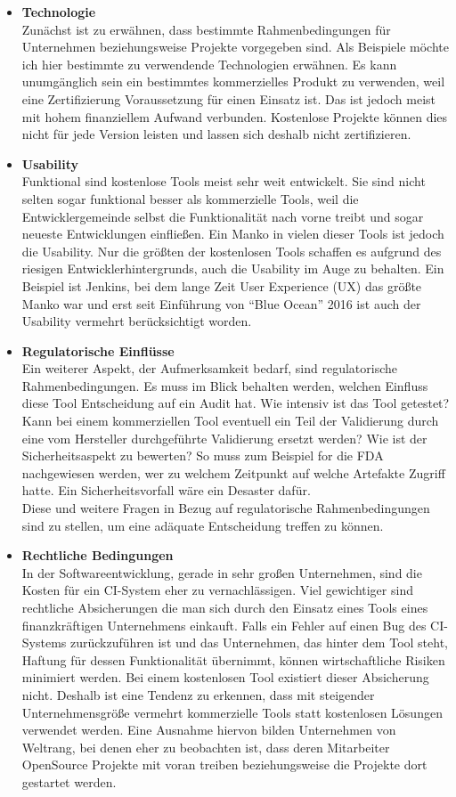 \begin{itemize}
	\item \textbf{Technologie}\\
	Zunächst ist zu erwähnen, dass bestimmte Rahmenbedingungen für Unternehmen beziehungsweise Projekte vorgegeben sind. Als Beispiele möchte ich hier bestimmte zu verwendende Technologien erwähnen. Es kann unumgänglich sein ein bestimmtes kommerzielles Produkt zu verwenden, weil eine Zertifizierung Voraussetzung für einen Einsatz ist. Das ist jedoch meist mit hohem finanziellem Aufwand verbunden. Kostenlose Projekte können dies nicht für jede Version leisten und lassen sich deshalb nicht zertifizieren.
	\item \textbf{Usability}\\
	Funktional sind kostenlose Tools meist sehr weit entwickelt. Sie sind nicht selten sogar funktional besser als kommerzielle Tools, weil die Entwicklergemeinde selbst die Funktionalität nach vorne treibt und sogar neueste Entwicklungen einfließen. Ein Manko in vielen dieser Tools ist jedoch die Usability. Nur die größten der kostenlosen Tools schaffen es aufgrund des riesigen Entwicklerhintergrunds, auch die Usability im Auge zu behalten. Ein Beispiel ist Jenkins, bei dem lange Zeit User Experience (UX) das größte Manko war und erst seit Einführung von "`Blue Ocean"' 2016 ist auch der Usability vermehrt berücksichtigt worden.
	\item \textbf{Regulatorische Einflüsse}\\
	Ein weiterer Aspekt, der Aufmerksamkeit bedarf, sind regulatorische Rahmenbedingungen. Es muss im Blick behalten werden, welchen Einfluss diese Tool Entscheidung auf ein Audit hat. Wie intensiv ist das Tool getestet? Kann bei einem kommerziellen Tool eventuell ein Teil der Validierung durch eine vom Hersteller durchgeführte Validierung ersetzt werden? Wie ist der Sicherheitsaspekt zu bewerten? So muss zum Beispiel for die FDA nachgewiesen werden, wer zu welchem Zeitpunkt auf welche Artefakte Zugriff hatte. Ein Sicherheitsvorfall wäre ein Desaster dafür.\\
	Diese und weitere Fragen in Bezug auf regulatorische Rahmenbedingungen sind zu stellen, um eine adäquate Entscheidung treffen zu können.
	\item \textbf{Rechtliche Bedingungen}\\
	In der Softwareentwicklung, gerade in sehr großen Unternehmen, sind die Kosten für ein CI-System eher zu vernachlässigen. Viel gewichtiger sind rechtliche Absicherungen die man sich durch den Einsatz eines Tools eines finanzkräftigen Unternehmens einkauft. Falls ein Fehler auf einen Bug des CI-Systems zurückzuführen ist und das Unternehmen, das hinter dem Tool steht, Haftung für dessen Funktionalität übernimmt, können wirtschaftliche Risiken minimiert werden. Bei einem kostenlosen Tool existiert dieser Absicherung nicht. Deshalb ist eine Tendenz zu erkennen, dass mit steigender Unternehmensgröße vermehrt kommerzielle Tools statt kostenlosen Lösungen verwendet werden. Eine Ausnahme hiervon bilden Unternehmen von Weltrang, bei denen eher zu beobachten ist, dass deren Mitarbeiter OpenSource Projekte mit voran treiben beziehungsweise die Projekte dort gestartet werden.
	\end{itemize}
